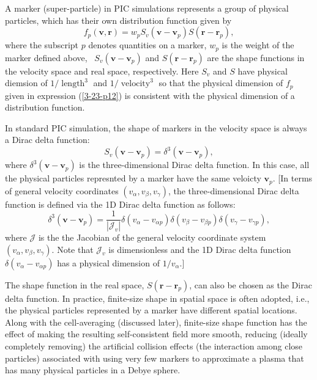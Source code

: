 \documentclass{article}
\newcommand{\tmop}[1]{\ensuremath{\operatorname{#1}}}
\begin{document}
A marker (super-particle) in PIC simulations represents a group of physical
particles, which has their own distribution function given by
\begin{equation}
  \label{3-23-p12} f_p (\mathbf{v}, \mathbf{r}) = w_p S_v
  (\mathbf{v}-\mathbf{v}_p) S (\mathbf{r}-\mathbf{r}_p),
\end{equation}
where the subscript $p$ denotes quantities on a marker, $w_p$ is the weight of
the marker defined above, \ $S_v (\mathbf{v}-\mathbf{v}_p)$ and $S
(\mathbf{r}-\mathbf{r}_p)$ are the shape functions in the velocity space and
real space, respectively. Here $S_v$ and $S$ have physical diemsion of $1 /
\tmop{length}^3$ and $1 / \tmop{velocity}^3$ so that the physical dimension of
$f_p$ given in expression (\ref{3-23-p12}) is consistent with the physical
dimension of a distribution function.

In standard PIC simulation, the shape of markers in the velocity space is
always a Dirac delta function:
\begin{equation}
  S_v (\mathbf{v}-\mathbf{v}_p) = \delta^3 (\mathbf{v}-\mathbf{v}_p),
\end{equation}
where $\delta^3 (\mathbf{v}-\mathbf{v}_p)$ is the three-dimensional Dirac
delta function. In this case, all the physical particles represnted by a
marker have the same veloicty $\mathbf{v}_p$. [In terms of general velocity
coordinates $(v_{\alpha}, v_{\beta}, v_{\gamma})$, the three-dimensional Dirac
delta function is defined via the 1D Dirac delta function as follows:
\begin{equation}
  \delta^3 (\mathbf{v}-\mathbf{v}_p) = \frac{1}{| \mathcal{J}_v |} \delta
  (v_{\alpha} - v_{\alpha p}) \delta (v_{\beta} - v_{\beta p}) \delta
  (v_{\gamma} - v_{\gamma p}),
\end{equation}
where $\mathcal{J}$ is the the Jacobian of the general velocity coordinate
system $(v_{\alpha}, v_{\beta}, v_{\gamma})$. Note that $\mathcal{J}_v$ is
dimensionless and the 1D Dirac delta function $\delta (v_{\alpha} - v_{\alpha
p})$ has a physical dimension of $1 / v_{\alpha}$.]

The shape function in the real space, $S (\mathbf{r}-\mathbf{r}_p)$, can also
be chosen as the Dirac delta function. In practice, finite-size shape in
spatial space is often adopted, i.e., the physical particles represented by a
marker have different spatial locations. Along with the cell-averaging
(discussed later), finite-size shape function has the effect of making the
resulting self-consistent field more smooth, reducing (ideally completely
removing) the artificial collision effects (the interaction among close
particles) associated with using very few markers to approximate a plasma that
has many physical particles in a Debye sphere{\cite{lapenta_pic}}.
\end{document}
